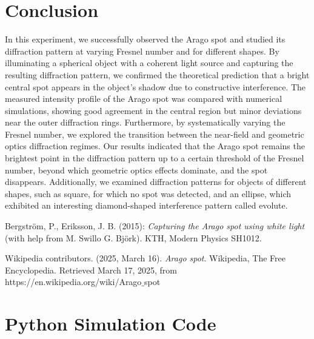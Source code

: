 \documentclass[11pt,a4paper]{article}
\begin{document}
\section{Conclusion}
In this experiment, we successfully observed the Arago spot and studied its diffraction pattern at varying Fresnel number and for different shapes. By illuminating a spherical object with a coherent light source and capturing the resulting diffraction pattern, we confirmed the theoretical prediction that a bright central spot appears in the object's shadow due to constructive interference. The measured intensity profile of the Arago spot was compared with numerical simulations, showing good agreement in the central region but minor deviations near the outer diffraction rings.
Furthermore, by systematically varying the Fresnel number, we explored the transition between the near-field and geometric optics diffraction regimes. Our results indicated that the Arago spot remains the brightest point in the diffraction pattern up to a certain threshold of the Fresnel number, beyond which geometric optics effects dominate, and the spot disappears. Additionally, we examined diffraction patterns for objects of different shapes, such as square, for which no spot was detected, and an ellipse, which exhibited an interesting diamond-shaped interference pattern called evolute. 

\onecolumn



\newpage

\begin{thebibliography}{99}
Bergström, P., Eriksson, J. B. (2015): \textit{Capturing the Arago spot using white light} (with help from M. Swillo G. Björk). KTH, Modern Physics SH1012.

Wikipedia contributors. (2025, March 16). \textit{Arago spot}. Wikipedia, The Free Encyclopedia. Retrieved March 17, 2025, from https://en.wikipedia.org/wiki/Arago$\_$spot

\end{thebibliography}

\appendix
\section{Python Simulation Code}
\end{document}
